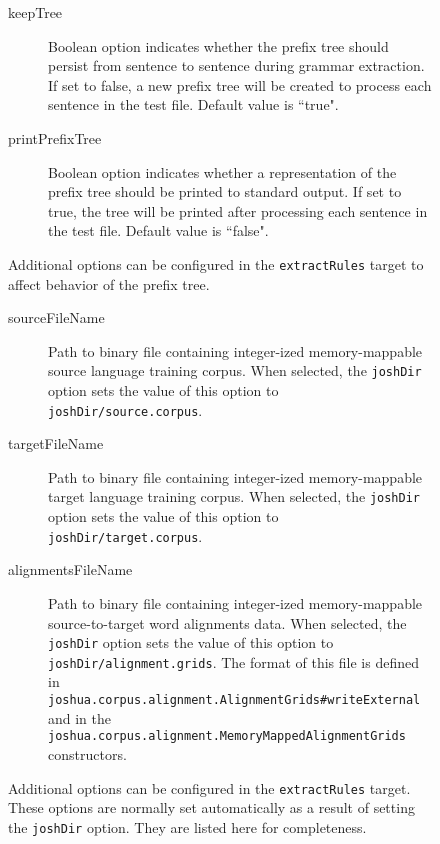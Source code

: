 \documentclass{pbml}
\begin{document}
\begin{figure}
\begin{description}
	\item[keepTree] Boolean option indicates whether the prefix tree should persist from sentence to sentence during grammar extraction. If set to false, a new prefix tree will be created to process each sentence in the test file. Default value is ``true".

	\item[printPrefixTree] Boolean option indicates whether a representation of the prefix tree should be printed to standard output. If set to true, the tree will be printed after processing each sentence in the test file. Default value is ``false".

\end{description}
\caption{Additional options can be configured in the {\tt extractRules} target to affect behavior of the prefix tree.}
\end{figure}



\begin{figure}
\begin{description}
	\item[sourceFileName] Path to binary file containing integer-ized memory-mappable source language training corpus. When selected, the {\tt joshDir} option sets the value of this option to {\tt joshDir/source.corpus}.

	\item[targetFileName] Path to binary file containing integer-ized memory-mappable target language training corpus. When selected, the {\tt joshDir} option sets the value of this option to {\tt joshDir/target.corpus}.

	\item[alignmentsFileName] Path to binary file containing integer-ized memory-mappable source-to-target word alignments data. When selected, the {\tt joshDir} option sets the value of this option to {\tt joshDir/alignment.grids}. The format of this file is defined in {\tt joshua.corpus.alignment.AlignmentGrids\#writeExternal} and in the {\tt joshua.corpus.alignment.MemoryMappedAlignmentGrids} constructors.
\end{description}
\caption{Additional options can be configured in the {\tt extractRules} target. These options are normally set automatically as a result of setting the {\tt joshDir} option. They are listed here for completeness.}
\end{figure}
\end{document}
